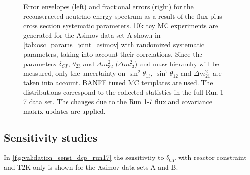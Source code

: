 \begin{figure}[htb]
\caption {
Error envelopes (left) and fractional errors (right) for the reconstructed neutrino energy spectrum
as a result of the flux plus cross section systematic parameters. 
10k toy MC experiments are generated for the Asimov data set A shown in \cref{tab:osc_params_joint_asimov}
with randomized systematic parameters, taking into account their correlations.
Since the parameters $\delta_{CP}$, $\theta_{23}$ and $\Delta m^2_{32}$ ($\Delta m^2_{13}$) and mass hierarchy
will be measured,
only the uncertainty on 
$\sin^2 \theta_{13}$,
$\sin^2 \theta_{12}$
and 
$\Delta m^2_{21}$ 
are taken into account.
BANFF tuned MC templates are used. 
The distributions correspond to the collected statistics in the full Run 1-7 data set.
The changes due to the Run 1-7 flux and covariance matrix updates are applied.
}
\label{fig:flux_xsec_envelope_Asimov_A_run17}
\end{figure}




\clearpage












%
% 

\subsection{Sensitivity studies}
\label{sec:sensi_run17}

In \cref{fig:validation_sensi_dcp_run17} the sensitivity to $\delta_{CP}$ 
with reactor constraint and T2K only is shown for the Asimov data sets A and B.

